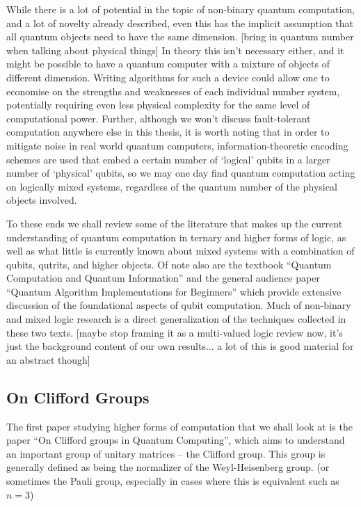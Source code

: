 While there is a lot of potential in the topic of non-binary quantum computation, and a lot of novelty already described, even this has the implicit assumption that all quantum objects need to have the same dimension. [bring in quantum number when talking about physical things] In theory this isn't necessary either, and it might be possible to have a quantum computer with a mixture of objects of different dimension. Writing algorithms for such a device could allow one to economise on the strengths and weaknesses of each individual number system, potentially requiring even less physical complexity for the same level of computational power. Further, although we won't discuss fault-tolerant computation anywhere else in this thesis, it is worth noting that in order to mitigate noise in real world quantum computers, information-theoretic encoding schemes are used that embed a certain number of `logical' qubits in a larger number of `physical' qubits, so we may one day find quantum computation acting on logically mixed systems, regardless of the quantum number of the physical objects involved.

To these ends we shall review some of the literature that makes up the current understanding of quantum computation in ternary and higher forms of logic, as well as what little is currently known about mixed systems with a combination of qubits, qutrits, and higher objects. Of note also are the textbook ``Quantum Computation and Quantum Information''\cite{textbook} and the general audience paper ``Quantum Algorithm Implementations for Beginners''\cite{algos} which provide extensive discussion of the foundational aspects of qubit computation. Much of non-binary and mixed logic research is a direct generalization of the techniques collected in these two texts. [maybe stop framing it as a multi-valued logic review now, it's just the background content of our own results... a lot of this is good material for an abstract though]

\subsection{On Clifford Groups}
The first paper studying higher forms of computation that we shall look at is the paper ``On Clifford groups in Quantum Computing''\cite{tolar-clifford}, which aims to understand an important group of unitary matrices -- the Clifford group. This group is generally defined as being the normalizer of the Weyl-Heisenberg group. (or sometimes the Pauli group, especially in cases where this is equivalent such as $n=3$)

